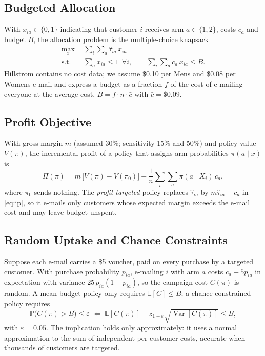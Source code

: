 \documentclass[10pt,twocolumn]{article}
\newcommand{\E}{\mathbb{E}}
\newcommand{\Prob}{\mathbb{P}}
\newcommand{\tauh}{\hat{\tau}}
\begin{document}
\subsection{Budgeted Allocation}
With $x_{ia}\in\{0,1\}$ indicating that customer $i$ receives arm $a\in\{1,2\}$, costs $c_a$ and
budget $B$, the allocation problem is the multiple-choice knapsack \citep{sinha1979}
\begin{equation}
\begin{aligned}
  \max_{x}\ \ & \textstyle\sum_{i}\sum_{a} \tauh_{ia}\, x_{ia}\\
  \text{s.t.}\ \ & \textstyle\sum_{a} x_{ia}\le 1\ \ \forall i, \qquad \sum_{i}\sum_{a} c_a\, x_{ia}\le B.
\end{aligned}
\label{eq:ip}
\end{equation}
Hillstrom contains no cost data; we assume \$0.10 per Mens and \$0.08 per Womens e-mail and express a
budget as a fraction $f$ of the cost of e-mailing everyone at the average cost, $B=f\cdot n\cdot\bar c$
with $\bar c=\$0.09$.

\subsection{Profit Objective}
With gross margin $m$ (assumed 30\%; sensitivity 15\% and 50\%) and policy value $V(\pi)$, the
incremental profit of a policy that assigns arm probabilities $\pi(a\mid x)$ is
\begin{equation}
  \Pi(\pi) = m\,\big[V(\pi)-V(\pi_0)\big] - \textstyle\frac1n\sum_i\sum_a \pi(a\mid X_i)\,c_a,
\end{equation}
where $\pi_0$ sends nothing. The \emph{profit-targeted} policy replaces $\tauh_{ia}$ by
$m\tauh_{ia}-c_a$ in \eqref{eq:ip}, so it e-mails only customers whose expected margin exceeds the
e-mail cost and may leave budget unspent.

\subsection{Random Uptake and Chance Constraints}
Suppose each e-mail carries a \$5 voucher, paid on every purchase by a targeted customer. With
purchase probability $p_{ia}$, e-mailing $i$ with arm $a$ costs $c_a+5p_{ia}$ in expectation with
variance $25\,p_{ia}(1-p_{ia})$, so the campaign cost $C(\pi)$ is random. A mean-budget policy only
requires $\E[C]\le B$; a chance-constrained policy \citep{charnes1959} requires
\begin{equation}
  \Prob\big(C(\pi)>B\big)\le\varepsilon \;\Longleftarrow\;
  \E[C(\pi)] + z_{1-\varepsilon}\sqrt{\operatorname{Var}[C(\pi)]}\le B,
\end{equation}
with $\varepsilon=0.05$. The implication holds only approximately: it uses a normal approximation
to the sum of independent per-customer costs, accurate when thousands of customers are targeted.
\end{document}

